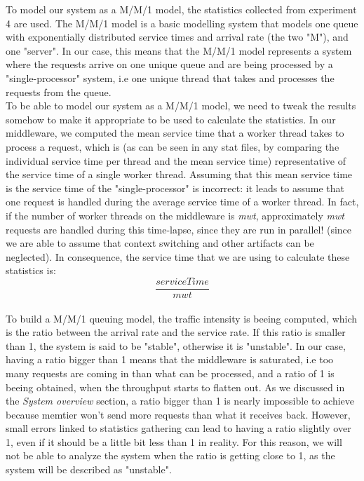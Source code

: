 \documentclass[11pt,a4paper]{article}
\begin{document}
To model our system as a M/M/1 model, the statistics collected from experiment 4 are used. 
The M/M/1 model is a basic modelling system that models one queue with exponentially distributed  service times and arrival rate (the two "M"), and one "server". In our case, this means that the M/M/1 model represents a system where the requests arrive on one unique queue and are being processed by a "single-processor" system, i.e one unique thread that takes and processes the requests from the queue.
\\
To be able to model our system as a M/M/1 model, we need to tweak the results somehow to make it appropriate to be used to calculate the statistics. In our middleware, we computed the mean service time that a worker thread takes to process a request, which is (as can be seen in any stat files, by comparing the individual service time per thread and the mean service time) representative of the service time of a single worker thread. Assuming that this mean service time is the service time of the "single-processor" is incorrect: it leads to assume that one request is handled during the average service time of a worker thread. In fact, if the number of worker threads on the middleware is \textit{mwt}, approximately \textit{mwt} requests are  handled during this time-lapse, since they are run in parallel! (since we are able to assume that context switching and other artifacts can be neglected). In consequence, the service time that we are using to calculate these statistics is: 
\[\frac{service Time}{mwt}\]
\\
To build a M/M/1 queuing model, the traffic intensity is beeing computed, which is the ratio between the arrival rate and the service rate. If this ratio is smaller than 1, the system is said to be "stable", otherwise it is "unstable". In our case, having a ratio bigger than 1 means that the middleware is saturated, i.e too many requests are coming in than what can be processed, and a ratio of 1 is beeing obtained, when the throughput starts to flatten out. As we discussed in the \textit{System overview} section, a ratio bigger than 1 is nearly impossible to achieve because memtier won't send more requests than what it receives back. However, small errors linked to statistics gathering can lead to having a ratio slightly over 1, even if it should be a little bit less than 1 in reality. For this reason, we will not be able to analyze the system when the ratio is getting close to 1, as the system will be described as "unstable".
\\\\
\end{document}

